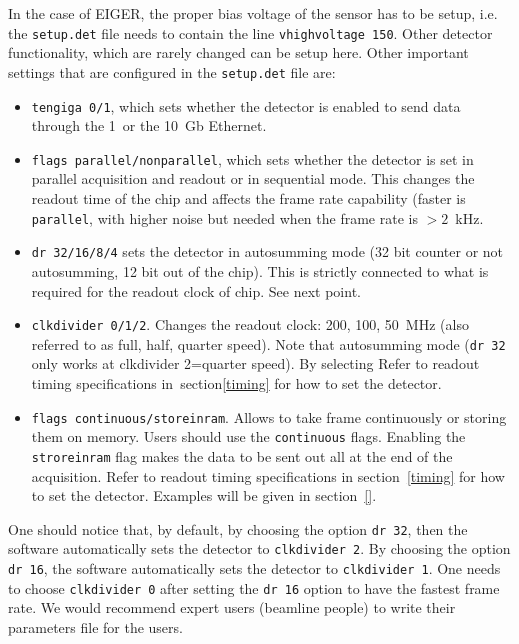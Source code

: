 \documentclass{article}
\newcommand{\E}{EIGER\xspace}
\begin{document}
In the case of \E, the proper bias voltage of the sensor has to be setup, i.e. the {\tt{setup.det}} file needs to contain the line {\tt{vhighvoltage 150}}. Other detector functionality, which are rarely changed can be setup here. 
Other important settings that are configured in the {\tt{setup.det}} file are:
\begin{itemize}
\item {\tt{tengiga 0/1}}, which sets whether the detector is enabled to send data through the 1~or the 10~Gb Ethernet.
\item {\tt{flags parallel/nonparallel}}, which sets whether the detector is set in parallel acquisition and readout or in sequential mode. This changes the readout time of the chip and affects the frame rate capability (faster is {\tt{parallel}}, with higher noise but needed when the frame rate is $>2$~kHz. 
\item {\tt{dr 32/16/8/4}} sets the detector in autosumming mode (32 bit counter or not autosumming, 12 bit out of the chip). This is strictly connected to what is required for the readout clock of chip. See next point.
\item {\tt{clkdivider 0/1/2}}. Changes the readout clock: 200, 100, 50~MHz (also referred to as full, half, quarter speed). Note that autosumming mode ({\tt{dr 32}} only works at {clkdivider 2}=quarter speed). By selecting Refer to readout timing specifications in~section\ref{timing} for how to set the detector. 
\item {\tt{flags continuous/storeinram}}. Allows to take frame continuously or storing them on memory. Users should use the {\tt{continuous}} flags. Enabling the {\tt{stroreinram}} flag makes the data to be sent out all at the end of the acquisition. Refer to readout timing specifications in section~\ref{timing} for how to set the detector. Examples will be given in section~\ref{}.
\end{itemize}

One should notice that, by default, by choosing the option {\tt{dr 32}}, then the software automatically sets the detector to  {\tt{clkdivider 2}}. By choosing the option {\tt{dr 16}}, the software automatically sets the detector to  {\tt{clkdivider 1}}. One needs to choose {\tt{clkdivider 0}} after setting the {\tt{dr 16}} option to have the fastest frame rate. 
We would recommend expert users (beamline people) to write their parameters file for the users. 
\end{document}
